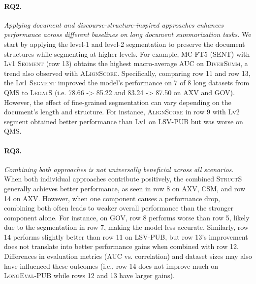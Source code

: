 \vspace{-1mm}
\paragraph{RQ2.} \textit{Applying document and discourse-structure-inspired approaches enhances performance across different baselines on long document summarization tasks.} We start by applying the level-1 and level-2 segmentation to preserve the document structures while segmenting at higher levels. For example, MC-FT5 (SENT) with \textsc{Lv1 Segment} (row 13) obtains the highest macro-average AUC on \textsc{DiverSumm}, a trend also observed with \textsc{ALignScore}. Specifically, comparing row 11 and row 13, the Lv1 \textsc{Segment} improved the model's performance on 7 of 8 long datasets from QMS to \textsc{LegalS} (i.e. 78.66 -> 85.22  and 83.24 -> 87.50  on AXV and GOV). However, the effect of fine-grained segmentation can vary depending on the document's length and structure. For instance, \textsc{AlignScore} in row 9 with Lv2 segment obtained better performance than Lv1 on LSV-PUB but was worse on QMS.
\vspace{-1mm}
\paragraph{RQ3.} \textit{Combining both approaches is not universally beneficial across all scenarios}. When both individual approaches contribute positively, the combined \textsc{StructS} generally achieves better performance, as seen in row 8 on AXV, CSM, and row 14 on AXV. However, when one component causes a performance drop, combining both often leads to weaker overall performance than the stronger component alone. For instance, on GOV, row 8 performs worse than row 5, likely due to the segmentation in row 7, making the model less accurate. Similarly, row 14 performs slightly better than row 11 on LSV-PUB, but row 13's improvement does not translate into better performance gains when combined with row 12.  Differences in evaluation metrics (AUC vs. correlation) and dataset sizes may also have influenced these outcomes (i.e., row 14 does not improve much on \textsc{LongEval}-PUB while rows 12 and 13 have larger gains).

